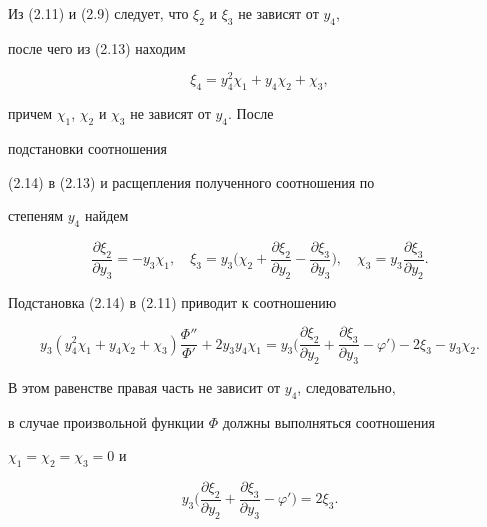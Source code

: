 Из (2.11) и (2.9) следует, что $\xi_2$ и $\xi_3$ не зависят от $y_4$, 


после чего из (2.13) находим 


\begin{equation} 


\xi_4=y^2_4\chi_1+y_4\chi_2+\chi_3,\tag{2.14} 


\end{equation} 


причем $\chi_1$, $\chi_2$ и $\chi_3$ не зависят от $y_4$. После 


подстановки соотношения 


(2.14) в (2.13) и расщепления полученного соотношения по 


степеням $y_4$ найдем 


\begin{equation} 


\frac{\partial\xi_2}{\partial y_3}=-y_3\chi_1,\quad 


\xi_3=y_3\bigg(\chi_2+ 


\frac{\partial\xi_2}{\partial y_2}- 


\frac{\partial\xi_3}{\partial y_3}\bigg),\quad 


\chi_3=y_3\frac{\partial\xi_3}{\partial y_2}.\tag{2.15} 


\end{equation} 


Подстановка (2.14) в (2.11) приводит к соотношению 


$$ 


y_3(y^2_4\chi_1+y_4\chi_2+\chi_3)\frac{\Phi''}{\Phi'}+ 


2y_3y_4\chi_1=y_3\bigg( 


\frac{\partial\xi_2}{\partial y_2}+\frac{\partial\xi_3}{\partial y_3} 


-\varphi'\bigg)-2\xi_3-y_3\chi_2. 


$$ 


В этом равенстве правая часть не зависит от $y_4$, следовательно, 


в случае произвольной функции $\Phi$ должны выполняться соотношения 


$\chi_1=\chi_2=\chi_3=0$ и 


$$ 


y_3\bigg( 


\frac{\partial\xi_2}{\partial y_2}+ 


\frac{\partial\xi_3}{\partial y_3}-\varphi'\bigg)=2\xi_3. 


$$ 


